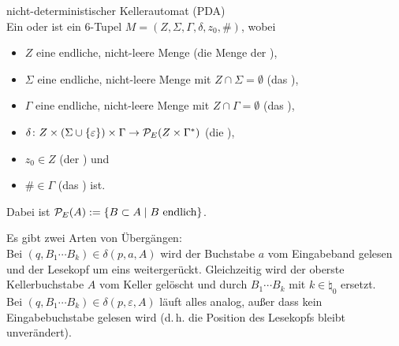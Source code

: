 \linie

\begin{Def}{nicht-deterministischer Kellerautomat (PDA)}\\
    Ein  oder
    ist ein $6$-Tupel $M = (Z, \Sigma, \Gamma, \delta, z_0, \#)$, wobei
    \begin{itemize}
        \item
        $Z$ eine endliche, nicht-leere Menge
        (die Menge der ),
        
        \item
        $\Sigma$ eine endliche, nicht-leere Menge
        mit $Z \cap \Sigma = \emptyset$
        (das ),
        
        \item
        $\Gamma$ eine endliche, nicht-leere Menge
        mit $Z \cap \Gamma = \emptyset$
        (das ),
        
        \item
        $\delta\colon Z \times (\Sigma \cup \{\varepsilon\}) \times \Gamma
        \rightarrow \P_E(Z \times \Gamma^\ast)$
        (die ),
        
        \item
        $z_0 \in Z$ (der ) und
        
        \item
        $\# \in \Gamma$ (das ) ist.
    \end{itemize}
    Dabei ist $\P_E(A) := \{B \subset A \;|\; B \text{ endlich}\}$.
\end{Def}

\begin{Bem}
    Es gibt zwei Arten von Übergängen:\\
    Bei 
    $(q, B_1 \dotsb B_k) \in \delta(p, a, A)$
    wird der Buchstabe $a$ vom Eingabeband gelesen und der Lesekopf um
    eins weitergerückt.
    Gleichzeitig wird der oberste Kellerbuchstabe $A$ vom Keller gelöscht und
    durch $B_1 \dotsb B_k$ mit $k \in \natural_0$ ersetzt.\\
    Bei 
    $(q, B_1 \dotsb B_k) \in \delta(p, \varepsilon, A)$
    läuft alles analog, außer dass kein Eingabebuchstabe gelesen wird
    (d.\,h. die Position des Lesekopfs bleibt unverändert).
\end{Bem}


